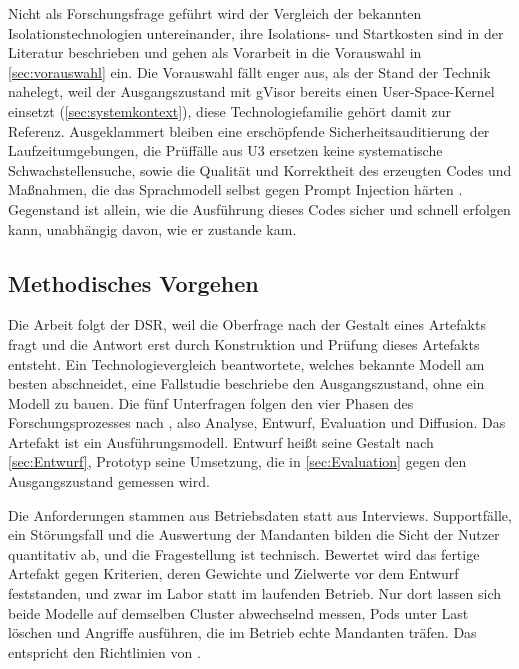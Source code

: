 Nicht als Forschungsfrage geführt wird der Vergleich der bekannten Isolationstechnologien untereinander, ihre
Isolations- und Startkosten sind in der Literatur beschrieben
\autocites[S.~420]{agache_firecracker_2020}[S.~1]{young_true_2019}[S.~419]{shillaker_faasm_2020} und gehen als Vorarbeit
in die Vorauswahl in \autoref{sec:vorauswahl} ein. Die Vorauswahl fällt enger aus, als der Stand der Technik nahelegt,
weil der Ausgangszustand mit gVisor bereits einen User-Space-Kernel einsetzt (\autoref{sec:systemkontext}), diese
Technologiefamilie gehört damit zur Referenz. Ausgeklammert bleiben eine erschöpfende Sicherheitsauditierung der
Laufzeitumgebungen, die Prüffälle aus U3 ersetzen keine systematische Schwachstellensuche, sowie die Qualität und
Korrektheit des erzeugten Codes und Maßnahmen, die das Sprachmodell selbst gegen Prompt Injection härten
\autocite[S.~79]{greshake_not_2023}. Gegenstand ist allein, wie die Ausführung dieses Codes sicher und schnell
erfolgen kann, unabhängig davon, wie er zustande kam.

\subsection{Methodisches Vorgehen}
\label{sec:einleitung:methodik}

Die Arbeit folgt der \ac{DSR}, weil die Oberfrage nach der Gestalt eines Artefakts fragt und die Antwort erst durch
Konstruktion und Prüfung dieses Artefakts entsteht. Ein Technologievergleich beantwortete, welches bekannte Modell am
besten abschneidet, eine Fallstudie beschriebe den Ausgangszustand, ohne ein Modell zu bauen. Die fünf Unterfragen
folgen den vier Phasen des Forschungsprozesses nach \textcite[S.~667--668]{osterle_memorandum_2010}, also Analyse,
Entwurf, Evaluation und Diffusion. Das Artefakt ist ein
Ausführungsmodell. Entwurf heißt seine Gestalt nach \autoref{sec:Entwurf}, Prototyp seine Umsetzung, die in
\autoref{sec:Evaluation} gegen den Ausgangszustand gemessen wird.

Die Anforderungen stammen aus Betriebsdaten statt aus Interviews. Supportfälle, ein Störungsfall und die Auswertung
der Mandanten bilden die Sicht der Nutzer quantitativ ab, und die Fragestellung ist technisch. Bewertet wird das fertige Artefakt gegen Kriterien, deren Gewichte und Zielwerte vor dem Entwurf
feststanden, und zwar im Labor statt im laufenden Betrieb. Nur dort lassen sich beide Modelle auf demselben Cluster abwechselnd messen, Pods unter Last löschen
und Angriffe ausführen, die im Betrieb echte Mandanten träfen. Das entspricht den Richtlinien von
\textcite[S.~83]{hevner_design_2004}.

